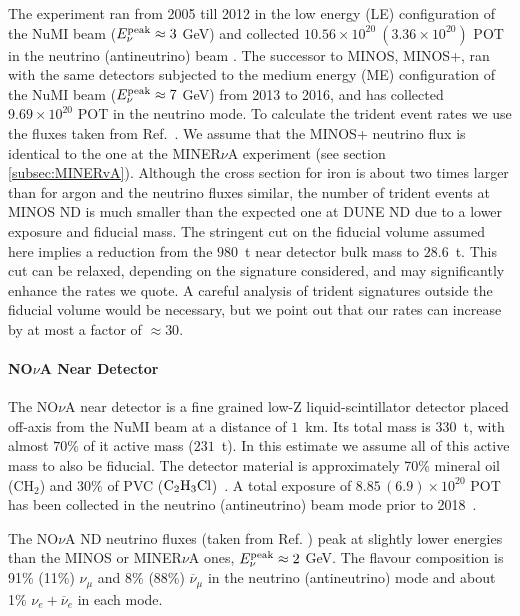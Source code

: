 %
The experiment ran from 2005 till 2012 in the low energy (LE) configuration of the NuMI beam ($E_\nu^{\rm peak} \approx 3$ GeV) and collected $10.56\times 10^{20} ~(3.36\times 10^{20})$ POT in the neutrino (antineutrino) beam \cite{Aurisano}. The successor to MINOS, MINOS+, ran with the same detectors subjected to the medium energy (ME) configuration of the NuMI beam ($E_\nu^{\rm peak} \approx 7$ GeV) from 2013 to 2016, and has collected $9.69\times 10^{20}$ POT in the neutrino mode.
%
To calculate the trident event rates we use the fluxes taken from Ref.~\cite{fluxes:nonLAr}. We assume that the MINOS+ neutrino flux is identical to the one at the MINER$\nu$A experiment (see section \ref{subsec:MINERvA}). Although the cross section for iron is about two times larger than for argon and the neutrino fluxes similar, the number of trident events at MINOS ND is much smaller than the expected one at DUNE ND due to a lower exposure and fiducial mass.
%
The stringent cut on the fiducial volume assumed here implies a reduction from the $980$~t near detector bulk mass to $28.6$~t. This cut can be relaxed, depending on the signature considered, and may significantly enhance the rates we quote. A careful analysis of trident signatures outside the fiducial volume would be necessary, but we point out that our rates can increase by at most a factor of $\approx30$.

\paragraph{NO$\nu$A Near Detector} The NO$\nu$A near detector is a fine grained low-Z liquid-scintillator detector placed off-axis from the NuMI beam at a distance of $1$~km. Its total mass is $330$~t, with almost $70$\% of it active mass ($231$~t). In this estimate we assume all of this active mass to also be fiducial. The detector material is approximately 70\% mineral oil (CH$_2$) and 30\% of PVC (${\rm{C_2H_3Cl}}$)~\cite{Wang:Biao}. A total exposure of $8.85 \, (6.9)\times10^{20}$ POT has been collected in the neutrino (antineutrino) beam mode prior to 2018~\cite{sanchez_mayly_2018_1286758}. 

The NO$\nu$A ND neutrino fluxes (taken from Ref. \cite{fluxes:nonLAr}) peak at slightly lower energies than the MINOS or MINER$\nu$A ones, $E_\nu^{\rm peak} \approx 2$ GeV. The flavour composition is 91\% (11\%) $\nu_\mu$ and 8\% (88\%) $\overline \nu_\mu$ in the neutrino (antineutrino) mode and about 1\% $\nu_e+\overline\nu_e$ in each mode.

